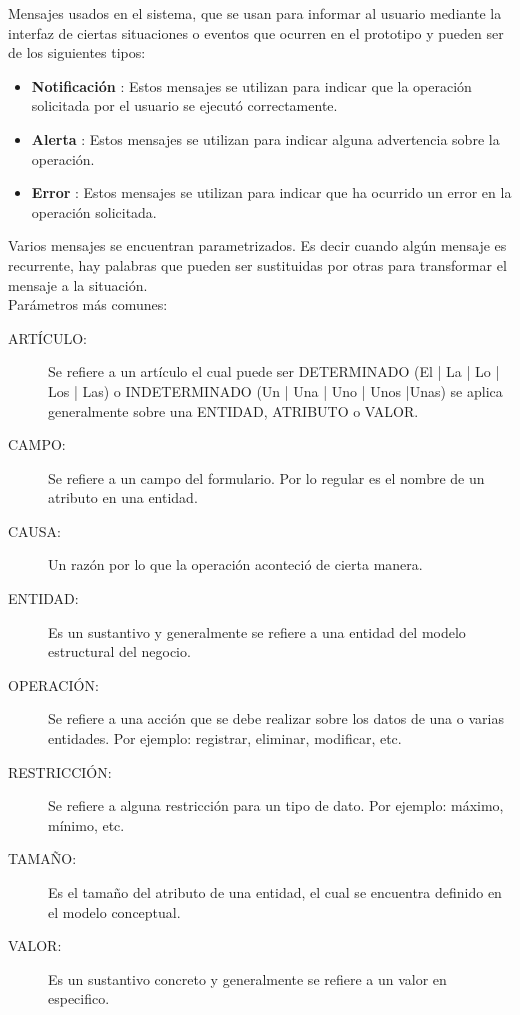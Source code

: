 Mensajes usados en el sistema, que se usan para informar al usuario mediante la interfaz de ciertas situaciones o eventos que ocurren en el prototipo y pueden ser de los siguientes tipos: \\
\begin{itemize}	
	\item \textbf{Notificación} : Estos mensajes se utilizan para indicar que la operación solicitada por el usuario se ejecutó correctamente.
	\item \textbf{Alerta} : Estos mensajes se utilizan para indicar alguna advertencia sobre la operación.
	\item \textbf{Error} : Estos mensajes se utilizan para indicar que ha ocurrido un error en la operación solicitada.
\end{itemize}	

Varios mensajes se encuentran parametrizados. Es decir cuando algún mensaje es recurrente, hay palabras que pueden ser sustituidas por otras para transformar el mensaje a la situación. \\

Parámetros más comunes: \\

\begin{description}
	\item[ARTÍCULO: ] Se refiere a un artículo el cual puede ser DETERMINADO (El | La | Lo | Los | Las) o INDETERMINADO (Un | Una | Uno | Unos |Unas) se aplica generalmente sobre una ENTIDAD, ATRIBUTO o VALOR.
	\item[CAMPO: ] Se refiere a un campo del formulario. Por lo regular es el nombre de un atributo en una entidad.
	\item[CAUSA: ] Un razón por lo que la operación aconteció de cierta manera.
	\item[ENTIDAD: ] Es un sustantivo y generalmente se refiere a una entidad del modelo estructural del negocio.
	\item[OPERACIÓN: ] Se refiere a una acción que se debe realizar sobre los datos de una o varias entidades. Por ejemplo: registrar, eliminar, modificar, etc.
	\item[RESTRICCIÓN: ] Se refiere a alguna restricción para un tipo de dato. Por ejemplo: máximo, mínimo, etc.
	\item[TAMAÑO: ] Es el tamaño del atributo de una entidad, el cual se encuentra definido en el modelo conceptual.
	\item[VALOR: ] Es un sustantivo concreto y generalmente se refiere a un valor en especifico.
\end{description}

